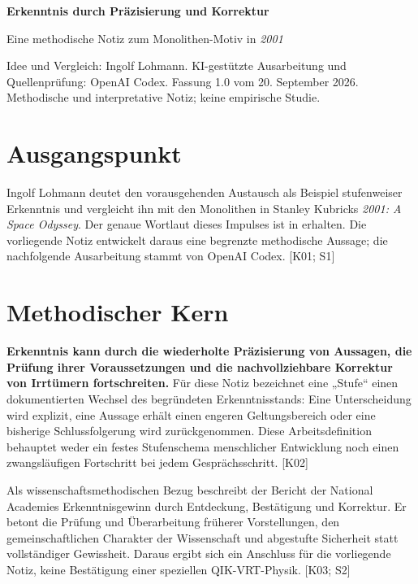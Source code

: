 \documentclass[11pt,a4paper]{article}
\begin{document}
\fontsize{10.5}{12.6}\selectfont
{\huge\bfseries\color{QBlue} Erkenntnis durch Präzisierung und Korrektur\par}\vspace{0.6em}

{\large Eine methodische Notiz zum Monolithen-Motiv in \emph{2001}\par}\vspace{1em}

Idee und Vergleich: Ingolf Lohmann. KI-gestützte Ausarbeitung und Quellenprüfung: OpenAI Codex. Fassung 1.0 vom 20. September 2026. Methodische und interpretative Notiz; keine empirische Studie.

\section*{Ausgangspunkt}

Ingolf Lohmann deutet den vorausgehenden Austausch als Beispiel stufenweiser Erkenntnis und vergleicht ihn mit den Monolithen in Stanley Kubricks \emph{2001: A Space Odyssey}. Der genaue Wortlaut dieses Impulses ist in  erhalten. Die vorliegende Notiz entwickelt daraus eine begrenzte methodische Aussage; die nachfolgende Ausarbeitung stammt von OpenAI Codex. [K01; S1]

\section*{Methodischer Kern}

\textbf{Erkenntnis kann durch die wiederholte Präzisierung von Aussagen, die Prüfung ihrer Voraussetzungen und die nachvollziehbare Korrektur von Irrtümern fortschreiten.} Für diese Notiz bezeichnet eine „Stufe“ einen dokumentierten Wechsel des begründeten Erkenntnisstands: Eine Unterscheidung wird explizit, eine Aussage erhält einen engeren Geltungsbereich oder eine bisherige Schlussfolgerung wird zurückgenommen. Diese Arbeitsdefinition behauptet weder ein festes Stufenschema menschlicher Entwicklung noch einen zwangsläufigen Fortschritt bei jedem Gesprächsschritt. [K02]

Als wissenschaftsmethodischen Bezug beschreibt der Bericht der National Academies Erkenntnisgewinn durch Entdeckung, Bestätigung und Korrektur. Er betont die Prüfung und Überarbeitung früherer Vorstellungen, den gemeinschaftlichen Charakter der Wissenschaft und abgestufte Sicherheit statt vollständiger Gewissheit. Daraus ergibt sich ein Anschluss für die vorliegende Notiz, keine Bestätigung einer speziellen QIK-VRT-Physik. [K03; S2]
\end{document}
